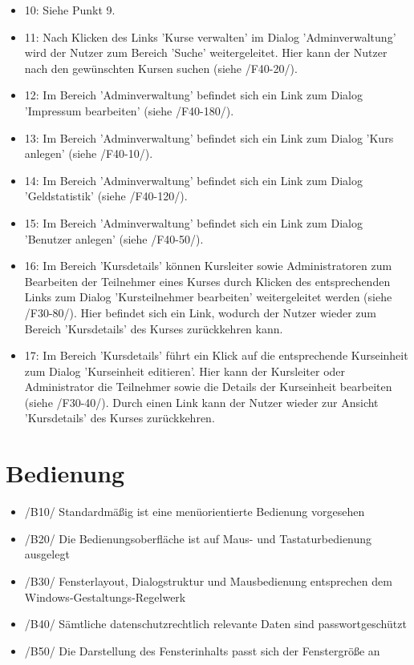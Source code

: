 \documentclass[a4paper]{scrreprt}
\begin{document}
\begin{itemize}
\begin{itemize}
	    \item 10: Siehe Punkt 9.
	    \item 11: Nach Klicken des Links 'Kurse verwalten' im Dialog 'Adminverwaltung' wird der Nutzer zum Bereich 'Suche' weitergeleitet. Hier kann der Nutzer nach den gewünschten Kursen suchen  (siehe /F40-20/).
	    \item 12: Im Bereich 'Adminverwaltung' befindet sich ein Link zum Dialog 'Impressum bearbeiten' (siehe /F40-180/).
	    \item 13: Im Bereich 'Adminverwaltung' befindet sich ein Link zum Dialog 'Kurs anlegen'  (siehe /F40-10/).
	    \item 14: Im Bereich 'Adminverwaltung' befindet sich ein Link zum Dialog 'Geldstatistik' (siehe /F40-120/).
	    \item 15: Im Bereich 'Adminverwaltung' befindet sich ein Link zum Dialog 'Benutzer anlegen' (siehe /F40-50/).
	    \item 16: Im Bereich 'Kursdetails' können Kursleiter sowie Administratoren zum Bearbeiten der Teilnehmer eines Kurses durch Klicken des entsprechenden Links zum Dialog 'Kursteilnehmer bearbeiten' weitergeleitet werden (siehe /F30-80/). Hier befindet sich ein Link, wodurch der Nutzer wieder zum Bereich 'Kursdetails' des Kurses zurückkehren kann.
	    \item 17: Im Bereich 'Kursdetails' führt ein Klick auf die entsprechende Kurseinheit zum Dialog 'Kurseinheit editieren'. Hier kann der Kursleiter oder Administrator die Teilnehmer sowie die Details der Kurseinheit bearbeiten (siehe /F30-40/). Durch einen Link kann der Nutzer wieder zur Ansicht 'Kursdetails' des Kurses zurückkehren.
	    \end{itemize}
	    
	    \end{itemize}
        
    \section{Bedienung}       
	    \begin{itemize}
			\item /B10/ Standardmäßig ist eine menüorientierte Bedienung vorgesehen
			\item /B20/ Die Bedienungsoberfläche ist auf Maus- und Tastaturbedienung ausgelegt
			\item /B30/ Fensterlayout, Dialogstruktur und Mausbedienung entsprechen dem Windows-Gestaltungs-Regelwerk
			\item /B40/ Sämtliche datenschutzrechtlich relevante Daten sind passwortgeschützt
			\item /B50/ Die Darstellung des Fensterinhalts passt sich der Fenstergröße an
		\end{itemize}
            
\end{document}
